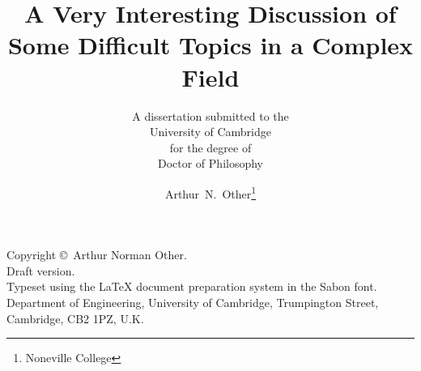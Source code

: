 \documentclass[a4paper,oneside,12pt]{RJWThesis}
\begin{document}
\begin{frontmatter}
\title{A Very Interesting Discussion of Some Difficult
  Topics in a Complex Field}
\subtitle{A dissertation submitted to the\\{\sc University of 
    Cambridge}\\for the degree of\\{\sc Doctor of Philosophy}}
\author{Arthur\ N.\ Other\thanks{Noneville College}
}
\maketitle
\cleardoublepage

\vspace*{0.2\textheight}
\noindent Copyright \copyright \number\year\ Arthur Norman Other.
\vspace*{1em}\\
\noindent Draft version.\\
\vfill
\noindent Typeset using the \LaTeX{} document preparation system
in the Sabon font.
\vfill
{}\newline
Department of Engineering,\newline
University of Cambridge,\newline
Trumpington Street,\newline
Cambridge, CB2 1PZ, U.K.
\cleardoublepage

\dedication{To someone}

\tableofcontents
\end{frontmatter}

\begin{mainmatter}

\end{mainmatter}
\end{document}
